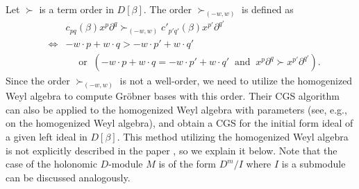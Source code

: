 \documentclass{article}
\def\pd#1{\partial_{#1}}
\begin{document}
Let $\succ$ is a term order in $D[\beta]$.
The order $\succ_{(-w,w)}$ is defined as
\begin{eqnarray*}
&&  c_{pq}(\beta) x^p \pd{}^q \succ_{(-w,w)}  c'_{p'q'}(\beta) x^{p'} \pd{}^{q'} \\
&\Leftrightarrow&
 -w\cdot p + w \cdot q >  -w\cdot p' + w \cdot q' \\
 & & \quad \mbox{ or } \ 
 (-w\cdot p + w \cdot q =  -w\cdot p' + w \cdot q' \ \mbox{ and } \ 
  x^p \pd{}^q \succ x^{p'} \pd{}^{q'}). 
\end{eqnarray*}
Since the order $\succ_{(-w,w)}$ is not a well-order,
we need to utilize the homogenized Weyl algebra to compute
Gr\"obner bases with this order.
Their CGS algorithm can also be applied 
to the homogenized Weyl algebra with parameters
(see, e.g., \cite[Th. 1.2.6]{SST} on the homogenized Weyl algebra),
and obtain a CGS for the initial form ideal
of a given left ideal in $D[\beta]$.
This method utilizing the homogenized Weyl algebra 
is not explicitly described in the paper \cite{not-2016}, 
so we explain it below.
Note that the case of the holonomic $D$-module $M$ is of the form
$D^m/I$ where $I$ is a submodule can be discussed analogously.
\end{document}
